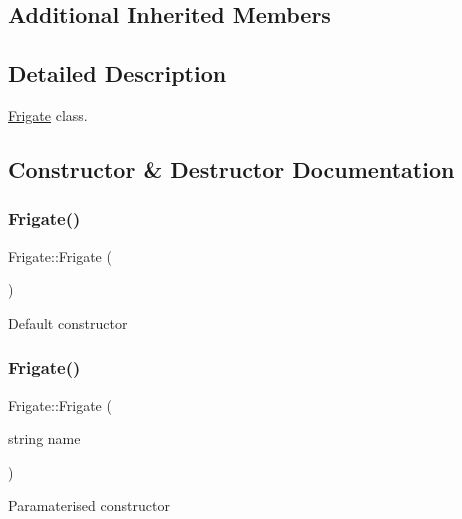 \subsection*{Additional Inherited Members}


\subsection{Detailed Description}
\hyperlink{classFrigate}{Frigate} class. 

\subsection{Constructor \& Destructor Documentation}
\mbox{\label{classFrigate_ad68c1d421cc3872688a19727055632a2}} 
\subsubsection{\texorpdfstring{Frigate()}{Frigate()}\hspace{0.1cm}{\footnotesize\ttfamily [1/2]}}
{\footnotesize\ttfamily Frigate\+::\+Frigate (\begin{DoxyParamCaption}{ }\end{DoxyParamCaption})\hspace{0.3cm}{\ttfamily [inline]}}

Default constructor \mbox{\label{classFrigate_a9904824a22b1784d1b5a9e742e8e0485}} 
\subsubsection{\texorpdfstring{Frigate()}{Frigate()}\hspace{0.1cm}{\footnotesize\ttfamily [2/2]}}
{\footnotesize\ttfamily Frigate\+::\+Frigate (\begin{DoxyParamCaption}\item[{string}]{name }\end{DoxyParamCaption})\hspace{0.3cm}{\ttfamily [inline]}}

Paramaterised constructor \mbox{\label{classFrigate_a86559f40e7725443c89039ee623fab2b}} 
